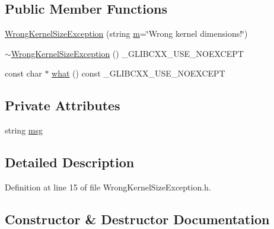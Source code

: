 \subsection*{Public Member Functions}
\begin{DoxyCompactItemize}
\item 
\hyperlink{class_vision_1_1_exception_1_1_wrong_kernel_size_exception_aa508534e1d81ab9b14e8abf156660fb4}{Wrong\+Kernel\+Size\+Exception} (string \hyperlink{_gen_blob_8m_ab3cd915d758008bd19d0f2428fbb354a}{m}=\char`\"{}Wrong kernel dimensions!\char`\"{})
\item 
\hyperlink{class_vision_1_1_exception_1_1_wrong_kernel_size_exception_a9b7e79b2201337021162b6685365cbb9}{$\sim$\+Wrong\+Kernel\+Size\+Exception} () \+\_\+\+G\+L\+I\+B\+C\+X\+X\+\_\+\+U\+S\+E\+\_\+\+N\+O\+E\+X\+C\+E\+P\+T
\item 
const char $\ast$ \hyperlink{class_vision_1_1_exception_1_1_wrong_kernel_size_exception_a5be675f9584d0c16a98bdb97f75d3287}{what} () const \+\_\+\+G\+L\+I\+B\+C\+X\+X\+\_\+\+U\+S\+E\+\_\+\+N\+O\+E\+X\+C\+E\+P\+T
\end{DoxyCompactItemize}
\subsection*{Private Attributes}
\begin{DoxyCompactItemize}
\item 
string \hyperlink{class_vision_1_1_exception_1_1_wrong_kernel_size_exception_a1d5f333a2deb78a3c696ec11f6bc7224}{msg}
\end{DoxyCompactItemize}


\subsection{Detailed Description}


Definition at line 15 of file Wrong\+Kernel\+Size\+Exception.\+h.



\subsection{Constructor \& Destructor Documentation}
\hypertarget{class_vision_1_1_exception_1_1_wrong_kernel_size_exception_aa508534e1d81ab9b14e8abf156660fb4}{}
